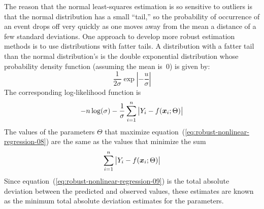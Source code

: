 \documentclass{admbmanual}
\begin{document}
The reason that the normal least-squares estimation is so sensitive to outliers
is that the normal distribution has a small ``tail,'' so the probability of
occurrence of an event drops off very quickly as one moves away from the mean a
distance of a few standard deviations. One approach to develop more robust
estimation methods is to use distributions with fatter tails. A distribution
with a fatter tail than the normal distribution's is the double exponential
distribution whose probability density function (assuming the mean is~0) is
given by:
\begin{equation}
  \label{eq:robust-nonlinear-regression-07} %
  \frac{1}{2\sigma}
    \exp\left|-\frac{u}{\sigma}\right|
\end{equation}
The corresponding log-likelihood function is
\begin{equation}
  \label{eq:robust-nonlinear-regression-08} %
  -n\log(\sigma)-\frac{1}{\sigma}
  \sum_{i=1}^n\big|Y_i-f({\mbox{\boldmath $x$}}_i;\Theta)\big|
\end{equation}
The values of the parameters $\Theta$ that maximize
equation~(\ref{eq:robust-nonlinear-regression-08}) %
are the same as the values that minimize the sum
\begin{equation}
  \label{eq:robust-nonlinear-regression-09} %
 \sum_{i=1}^n\big|Y_i-f({\mbox{\boldmath $x$}}_i;\Theta)\big|
\end{equation}
Since equation~(\ref{eq:robust-nonlinear-regression-09}) %
is the total absolute deviation between the predicted and observed values, these
estimates are known as the minimum total absolute deviation estimates for the
parameters.
\end{document}
